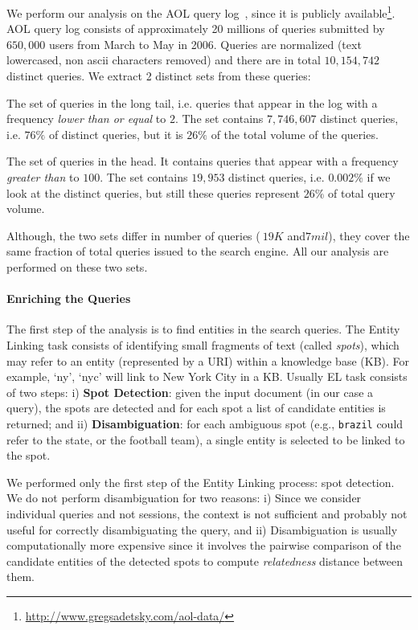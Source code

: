 We perform our analysis on the AOL query log~\cite{pass2006picture}, since it is publicly available\footnote{\url{http://www.gregsadetsky.com/aol-data/}}. AOL query log consists of approximately 20 millions of queries submitted by $650,000$ users from March to May in 2006. Queries are normalized (text lowercased, non ascii characters removed) and there are in total $10,154,742$ distinct queries. 
We extract 2 distinct sets from these queries: 
\begin{description}
	\item{\tail{}} The set of queries in the long tail, i.e. queries that appear in the log with a frequency \emph{lower than or equal} to $2$. The set contains $7,746,607$ distinct queries, i.e. $76\%$ of distinct queries, but it is $26\%$ of the total volume of the queries.
	\item{\head{}} The set of queries in the head. It contains queries that appear with a frequency \emph{greater than} to $100$. The set contains $19,953$ distinct queries, i.e. $0.002\%$ if we look at the distinct queries, but still these queries represent $26\%$ of total query volume.%
\end{description}
Although, the two sets differ in number of queries ($~19K$ and$7mil$), they cover the same fraction of total queries issued to the search engine. All our analysis are performed on these two sets.

\paragraph{Enriching the Queries}
The first step of the analysis is to find entities in the search queries.  
The Entity Linking task consists of identifying small fragments of text (called \emph{spots}), which may refer to an entity (represented by a URI) within a knowledge base (KB). For example, `ny', `nyc' will link to New York City in a KB. 
Usually EL task consists of two steps: i) \textbf{Spot Detection}: given the input document (in our case a query), 
the spots are detected and for each spot a list of candidate entities is returned; and ii) \textbf{Disambiguation}:
for each ambiguous spot (e.g., \texttt{brazil} could refer to the state, or the football team), a single entity is 
selected to be linked to the spot.

We performed only the first step of the Entity Linking process: spot detection. 
We do not perform disambiguation for two reasons: i) Since we consider individual queries and not sessions, the context is not sufficient and probably not useful for correctly disambiguating the query, and ii) Disambiguation is usually computationally more expensive
since it involves the pairwise comparison of the candidate entities of the detected spots to compute \emph{relatedness}\cite{milne2008learning} distance between them.

